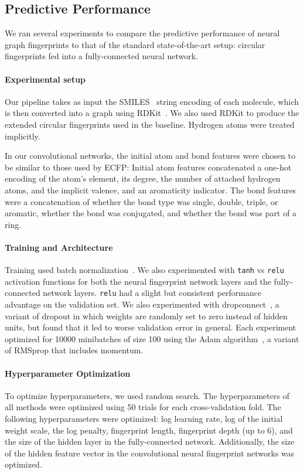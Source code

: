 \documentclass{article}
\newcommand{\citep}{\cite}
\begin{document}
\subsection{Predictive Performance}

We ran several experiments to compare the predictive performance of neural graph fingerprints to that of the standard state-of-the-art setup: circular fingerprints fed into a fully-connected neural network.

\paragraph{Experimental setup}
Our pipeline takes as input the SMILES~\citep{weininger1988smiles} string encoding of each molecule, which is then converted into a graph using RDKit~\citep{rdkit}.
We also used RDKit to produce the extended circular fingerprints used in the baseline.
Hydrogen atoms were treated implicitly.

In our convolutional networks, the initial atom and bond features were chosen to be similar to those used by ECFP:
Initial atom features concatenated a one-hot encoding of the atom's element, its degree, the number of attached hydrogen atoms, and the implicit valence, and an aromaticity indicator.
The bond features were a concatenation of whether the bond type was single, double, triple, or aromatic, whether the bond was conjugated, and whether the bond was part of a ring.

\paragraph{Training and Architecture}
Training used batch normalization~\citep{ioffe2015batch}.
We also experimented with \texttt{tanh} vs \texttt{relu} activation functions for both the neural fingerprint network layers and the fully-connected network layers.
\texttt{relu} had a slight but consistent performance advantage on the validation set.
We also experimented with dropconnect~\citep{wan2013regularization}, a variant of dropout in which weights are randomly set to zero instead of hidden units, but found that it led to worse validation error in general.
Each experiment optimized for 10000 minibatches of size 100 using the Adam algorithm~\citep{Adam14}, a variant of RMSprop that includes momentum.

\paragraph{Hyperparameter Optimization}
To optimize hyperparameters, we used random search.
The hyperparameters of all methods were optimized using 50 trials for each cross-validation fold.
The following hyperparameters were optimized: log learning rate, log of the initial weight scale, the log  penalty, fingerprint length, fingerprint depth (up to 6), and the size of the hidden layer in the fully-connected network.
Additionally, the size of the hidden feature vector in the convolutional neural fingerprint networks was optimized.
\end{document}
